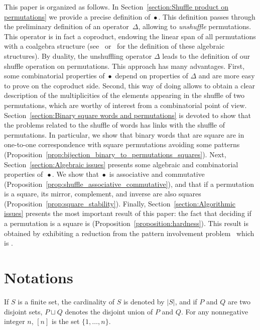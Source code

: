 \documentclass[a4paper]{llncs}
\DeclareMathOperator{\SHUFFLE}{\bullet}
\begin{document}
This paper is organized as follows. In
Section~\ref{section:Shuffle product on permutations} we provide a
precise definition of $\SHUFFLE$. This definition passes through the
preliminary definition of an operator~$\Delta$, allowing to
{\em unshuffle} permutations. This operator is in fact a coproduct,
endowing the linear span of all permutations with a coalgebra structure
(see~\cite{Joni:Rota:1979} or~\cite{Grinberg:Reiner:2014} for the
definition of these algebraic structures). By duality, the unshuffling
operator $\Delta$ leads to the definition of our shuffle operation on
permutations. This approach has many advantages. First, some
combinatorial properties of $\SHUFFLE$ depend on properties of $\Delta$
and are more easy to prove on the coproduct side. Second, this way of
doing allows to obtain a clear description of the multiplicities of the
elements appearing in the shuffle of two permutations, which are worthy
of interest from a combinatorial point of view.
Section~\ref{section:Binary square words and permutations} is devoted to
show that the problems related to the shuffle of words has links with
the shuffle of permutations. In particular, we show that binary words
that are square are in one-to-one correspondence with square
permutations avoiding some patterns
(Proposition~\ref{prop:bijection_binary_to_permutations_squares}). Next,
Section~\ref{section:Algebraic issues} presents some algebraic and
combinatorial properties of~$\SHUFFLE$. We show that $\SHUFFLE$ is
associative and commutative
(Proposition~\ref{prop:shuffle_associative_commutative}), and that if a
permutation is a square, its mirror, complement, and inverse are also
squares (Proposition~\ref{prop:square_stability}). Finally,
Section~\ref{section:Algorithmic issues} presents the most important result
of this paper: the fact that deciding if a permutation is a square is
\NPC (Proposition~\ref{proposition:hardness}). This result is obtained
by exhibiting a reduction from the pattern involvement
problem~\cite{Bose:Buss:Lubiw:1998} which is \NPC.


\section{Notations}
\label{section:Notations}

If $S$ is a finite set, the cardinality of $S$ is denoted by $|S|$,
and if $P$ and $Q$ are two disjoint sets, $P \sqcup Q$ denotes the
disjoint union of $P$ and $Q$. For any nonnegative integer $n$, $[n]$
is the set $\{1, \dots, n\}$.
\end{document}
